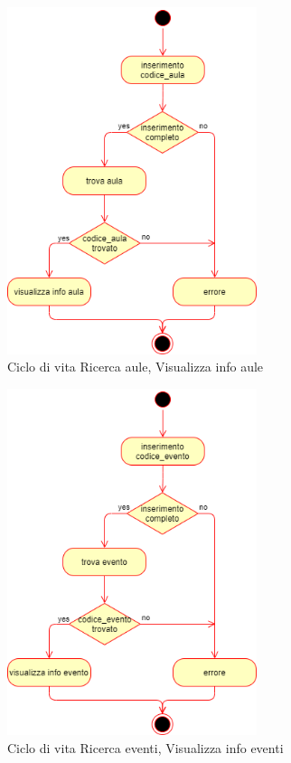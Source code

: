\documentclass[11pt]{article}
\begin{document}
\begin{figure}[H]
\centering
\includegraphics[width=0.65\textwidth]{Ciclo di vita Ricerca aule, Visualizza info.png}
\caption{Ciclo di vita Ricerca aule, Visualizza info aule}
\end{figure}

\begin{figure}[H]
\centering
\includegraphics[width=0.65\textwidth]{Ciclo di vita Ricerca eventi, Visualizza info.png}
\caption{Ciclo di vita Ricerca eventi, Visualizza info eventi}
\end{figure}
\end{document}
